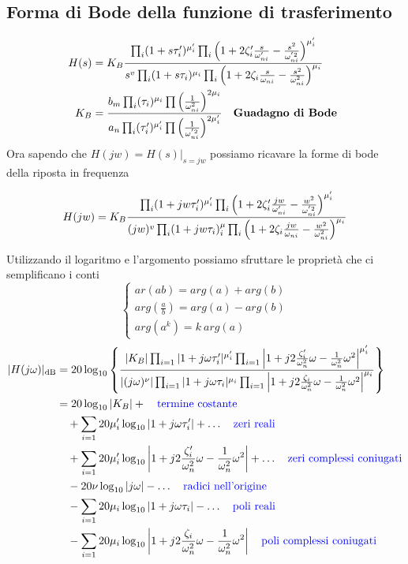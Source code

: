 \documentclass{article}
\theoremstyle{definition}
\begin{document}
\subsection{Forma di Bode della funzione di trasferimento }
\begin{align*}
	H(s)&=K_B\frac{\prod_i (1+s\tau_i')^{\mu'_i}\prod_i\left(1+2\zeta'_i \frac{s}{\omega'_{ni}}-\frac{s^2}{\omega^{'2}_{ni} }\right)^{\mu'_{i}}}{s^v \prod_i (1+s\tau_i)^{\mu_i}\prod_i\left(1+2\zeta_i \frac{s}{\omega_{ni}}-\frac{s^2}{\omega^{2}_{ni}} \right) ^{\mu_i}} \\
	K_B&=\frac{b_m \prod_i (\tau_i)^{\mu_i}\prod\left(\frac{1}{\omega^2_{ni}}\right)^{2\mu_i}}{a_n \prod_i (\tau'_i)^{\mu'_i}\prod\left(\frac{1}{\omega^{'2}_{ni}}\right)^{2\mu'_i}} \ \ \ \text{\textbf{Guadagno di Bode }}
\end{align*}
Ora sapendo che $H(jw)=H(s)\Big|_{s=jw}$ possiamo ricavare la forme di bode della riposta in frequenza 
\begin{tcolorbox}
$$	H(jw)=K_B\frac{\prod_i (1+jw\tau_i')^{\mu'_i}\prod_i\left(1+2\zeta'_i \frac{jw}{\omega'_{ni}}-\frac{w^2}{\omega^{'2}_{ni} }\right)^{\mu'_{i}}}{(jw)^v \prod_i (1+jw\tau_i)^\mu_i\prod_i\left(1+2\zeta_i \frac{jw}{\omega_{ni}}-\frac{w^2}{\omega^{2}_{ni}} \right) ^{\mu_i}} \\$$
\end{tcolorbox}
Utilizzando il logaritmo e l'argomento possiamo sfruttare le proprietà che ci semplificano i conti 
$$\begin{cases}
	ar(ab)=arg(a)+arg(b) \\
	arg(\frac{a}{b})=arg(a)-arg(b)\\
	arg(a^k)=k\ arg(a)
\end{cases}$$
\begin{align*}
	|H(j\omega)|_{\text{dB}} &= 20 \log_{10} \left\{ 
	\frac{
		|K_B| \prod_{i=1} |1 + j\omega\tau_i'|^{\mu_i'} \prod_{i=1} \left|1 + j2\frac{\zeta_i'}{\omega_n^2}\omega - \frac{1}{\omega_n^2}\omega^2\right|^{\mu_i'}
	}{
		|(j\omega)^\nu| \prod_{i=1} |1 + j\omega\tau_i|^{\mu_i} \prod_{i=1} \left|1 + j2\frac{\zeta_i}{\omega_n^2}\omega - \frac{1}{\omega_n^2}\omega^2\right|^{\mu_i}
	} 
	\right\} \\
	&= 20 \log_{10} |K_B| + \quad  \text{\textcolor{blue}{termine costante}} \\
	&\quad + \sum_{i=1} 20\mu_i' \log_{10}|1 + j\omega\tau_i'| + \ldots \quad \text{\textcolor{blue}{zeri reali}} \\
	&\quad + \sum_{i=1} 20\mu_i' \log_{10}\left|1 + j2\frac{\zeta_i'}{\omega_n^2}\omega - \frac{1}{\omega_n^2}\omega^2\right| + \ldots \quad \text{\textcolor{blue}{zeri complessi coniugati}} \\
	&\quad -20\nu \log_{10}|j\omega| - \ldots \quad \text{\textcolor{blue}{radici nell'origine}} \\
	&\quad - \sum_{i=1} 20\mu_i \log_{10}|1 + j\omega\tau_i| - \ldots \quad \text{\textcolor{blue}{poli reali}} \\
	&\quad - \sum_{i=1} 20\mu_i \log_{10}\left|1 + j2\frac{\zeta_i}{\omega_n^2}\omega - \frac{1}{\omega_n^2}\omega^2\right| \quad \text{\textcolor{blue}{poli complessi coniugati}}
\end{align*}
\end{document}
